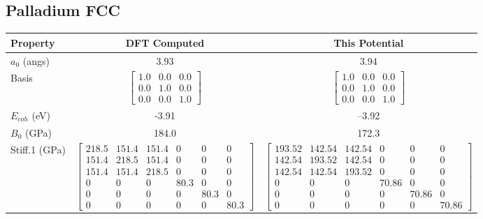 
\clearpage
\FloatBarrier
\subsection{Palladium FCC}

\begin{table}[ht]
\renewcommand{\arraystretch}{1.2}
\begin{tabular}{lcccccc}
\hline\hline
Property & \multicolumn{3}{c}{DFT Computed} & \multicolumn{3}{c}{This Potential} \\
\hline\hline
$a_0$ (angs)         & \multicolumn{3}{c}{3.93}   & \multicolumn{3}{c}{3.94} \\
Basis            & \multicolumn{3}{c}{$\begin{bmatrix} 1.0 & 0.0 & 0.0 \\ 0.0 & 1.0 & 0.0 \\ 0.0 & 0.0 & 1.0  \end{bmatrix}$} & \multicolumn{3}{c}{$\begin{bmatrix} 1.0 & 0.0 & 0.0 \\ 0.0 & 1.0 & 0.0 \\ 0.0 & 0.0 & 1.0  \end{bmatrix}$} \\
$E_{coh}$ (eV)           & \multicolumn{3}{c}{-3.91}  & \multicolumn{3}{c}{--3.92} \\
$B_0$ (GPa)              & \multicolumn{3}{c}{184.0}  & \multicolumn{3}{c}{172.3} \\
Stiff.1 (GPa) & \multicolumn{3}{c}{$\begin{bmatrix} 218.5 & 151.4 & 151.4 & 0 & 0 & 0 \\ 151.4 & 218.5 & 151.4 & 0 & 0 & 0 \\ 151.4 & 151.4 & 218.5 & 0 & 0 & 0 \\ 0 & 0 & 0 & 80.3 & 0 & 0 \\ 0 & 0 & 0 & 0 & 80.3 & 0 \\ 0 & 0 & 0 & 0 & 0 & 80.3 \end{bmatrix}$}   & \multicolumn{3}{c}{$\begin{bmatrix} 193.52 & 142.54 & 142.54 & 0 & 0 & 0 \\ 142.54 & 193.52 & 142.54 & 0 & 0 & 0 \\ 142.54 & 142.54 & 193.52 & 0 & 0 & 0 \\ 0 & 0 & 0 & 70.86 & 0 & 0 \\ 0 & 0 & 0 & 0 & 70.86 & 0 \\ 0 & 0 & 0 & 0 & 0 & 70.86 \end{bmatrix}$} \\

\end{tabular}
\end{table}
